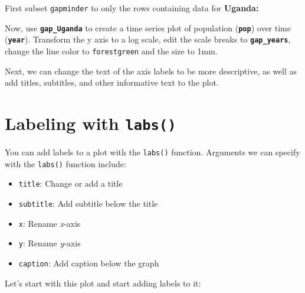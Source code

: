 \documentclass[
  letterpaper,
  DIV=11,
  numbers=noendperiod]{scrreprt}
\providecommand{\tightlist}{%
  \setlength{\itemsep}{0pt}\setlength{\parskip}{0pt}}\usepackage{longtable,booktabs,array}
\begin{document}
\begin{tcolorbox}[enhanced jigsaw, colframe=quarto-callout-tip-color-frame, colbacktitle=quarto-callout-tip-color!10!white, titlerule=0mm, opacitybacktitle=0.6, breakable, toprule=.15mm, arc=.35mm, rightrule=.15mm, colback=white, bottomrule=.15mm, opacityback=0, toptitle=1mm, left=2mm, bottomtitle=1mm, title=\textcolor{quarto-callout-tip-color}{\faLightbulb}\hspace{0.5em}{Practice}, leftrule=.75mm, coltitle=black]

First subset \texttt{gapminder} to only the rows containing data for
\textbf{Uganda:}

Now, use \textbf{\texttt{gap\_Uganda}} to create a time series plot of
population (\textbf{\texttt{pop}}) over time (\textbf{\texttt{year}}).
Transform the y axis to a log scale, edit the scale breaks to
\textbf{\texttt{gap\_years}}, change the line color to
\texttt{forestgreen} and the size to 1mm.

\end{tcolorbox}

Next, we can change the text of the axis labels to be more descriptive,
as well as add titles, subtitles, and other informative text to the
plot.

\hypertarget{labeling-with-labs}{%
\section{\texorpdfstring{Labeling with
\texttt{labs()}}{Labeling with labs()}}\label{labeling-with-labs}}

You can add labels to a plot with the \texttt{labs()} function.
Arguments we can specify with the \texttt{labs()} function include:

\begin{itemize}
\tightlist
\item
  \texttt{title}: Change or add a title
\item
  \texttt{subtitle}: Add subtitle below the title
\item
  \texttt{x}: Rename \emph{x}-axis
\item
  \texttt{y}: Rename \emph{y}-axis
\item
  \texttt{caption}: Add caption below the graph
\end{itemize}

Let's start with this plot and start adding labels to it:
\end{document}
